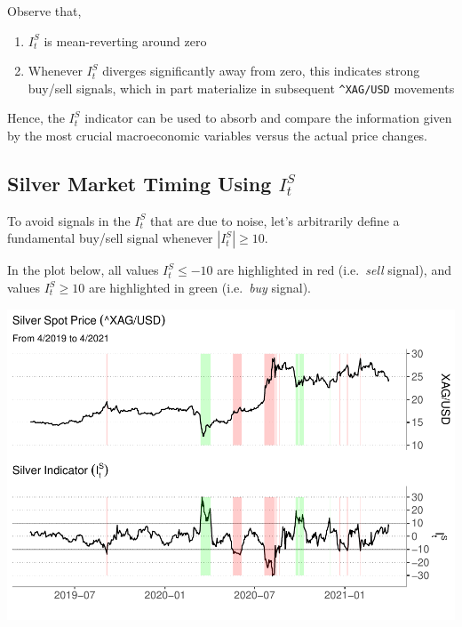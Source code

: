 \documentclass[
  12pt,
]{article}
\providecommand{\tightlist}{%
  \setlength{\itemsep}{0pt}\setlength{\parskip}{0pt}}
\begin{document}
Observe that,

\begin{enumerate}
\def\labelenumi{\arabic{enumi}.}
\tightlist
\item
  \(I^S_t\) is mean-reverting around zero
\item
  Whenever \(I^S_t\) diverges significantly away from zero, this
  indicates strong buy/sell signals, which in part materialize in
  subsequent \texttt{\^{}XAG/USD} movements
\end{enumerate}

Hence, the \(I^S_t\) indicator can be used to absorb and compare the
information given by the most crucial macroeconomic variables versus the
actual price changes.

\newpage

\hypertarget{silver-market-timing-using-is_t}{%
\subsection{\texorpdfstring{Silver Market Timing Using
\(I^S_t\)}{Silver Market Timing Using I\^{}S\_t}}\label{silver-market-timing-using-is_t}}

To avoid signals in the \(I^S_t\) that are due to noise, let's
arbitrarily define a fundamental buy/sell signal whenever
\(|I^S_t| \ge 10\).

In the plot below, all values \(I^S_t \leq -10\) are highlighted in red
(i.e.~\emph{sell} signal), and values \(I^S_t \geq 10\) are highlighted
in green (i.e.~\emph{buy} signal).

\includegraphics{silver-market-timing_files/figure-latex/highlighted-plot-1.pdf}
\end{document}
